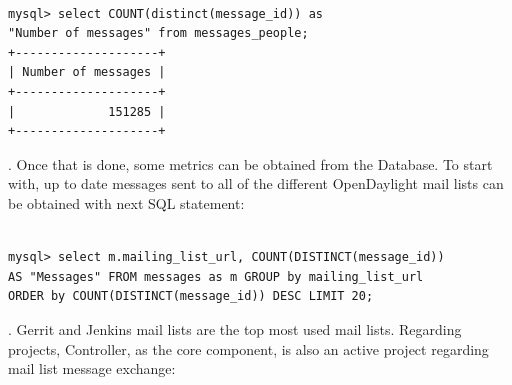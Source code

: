\documentclass[a4paper, 12pt]{book}
\begin{document}
\begin{verbatim}

mysql> select COUNT(distinct(message_id)) as
"Number of messages" from messages_people;
+--------------------+
| Number of messages |
+--------------------+
|             151285 |
+--------------------+

\end{verbatim}
. Once that is done, some metrics can be obtained from the Database. To start with, up to date messages sent to all of the different OpenDaylight mail lists can be obtained with next SQL statement:

\begin{verbatim}

mysql> select m.mailing_list_url, COUNT(DISTINCT(message_id))
AS "Messages" FROM messages as m GROUP by mailing_list_url
ORDER by COUNT(DISTINCT(message_id)) DESC LIMIT 20;

\end{verbatim}
. Gerrit and Jenkins mail lists are the top most used mail lists. Regarding projects, Controller, as the core component, is also an active project regarding mail list message exchange:
\end{document}
